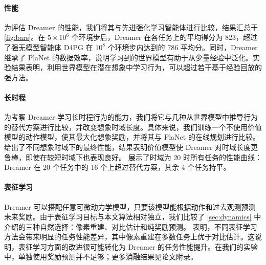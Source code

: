 \vspace*{5ex}
\pagebreak

\paragraph{性能}

为评估 Dreamer 的性能，我们将其与先进强化学习智能体进行比较，结果汇总于 \cref{fig:bars}。在 $5\times10^6$ 个环境步后，Dreamer 在各任务上的平均得分为 $823$，超过了强无模型智能体 D4PG 在 $10^8$ 个环境步内达到的 $786$ 平均分。同时，Dreamer 继承了 PlaNet 的数据效率，说明学习到的世界模型有助于从少量经验中泛化。实验结果表明，利用世界模型在潜在想象中学习行为，可以超过若干基于经验回放的强方法。

\paragraph{长时程}

为考察 Dreamer 学习长时程行为的能力，我们将它与几种从世界模型中推导行为的替代方案进行比较，并改变想象时域长度。具体来说，我们训练一个不使用价值模型的动作模型，使其最大化想象奖励，并将其与 PlaNet 的在线规划进行比较。 给出了不同想象时域下的最终性能，结果表明价值模型使 Dreamer 对时域长度更鲁棒，即使在较短时域下也表现良好。 展示了时域为 20 时所有任务的性能曲线：Dreamer 在 20 个任务中的 16 个上超过替代方案，其余 4 个任务持平。

\paragraph{表征学习}

Dreamer 可以搭配任意可微动力学模型，只要该模型能根据动作和过去观测预测未来奖励。由于表征学习目标与本文算法相对独立，我们比较了 \cref{sec:dynamics} 中介绍的三种自然选择：像素重建、对比估计和纯奖励预测。 表明，不同表征学习方法会带来明显的任务性能差异，其中像素重建在多数任务上优于对比估计。这说明，表征学习方面的改进很可能转化为 Dreamer 的任务性能提升。在我们的实验中，单独使用奖励预测并不足够；更多消融结果见论文附录。
